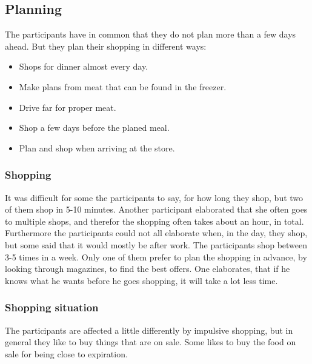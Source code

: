 \subsection{Planning}
The participants have in common that they do not plan more than a few days ahead. But they plan their shopping in different ways:
\begin{itemize}
\item Shops for dinner almost every day.
\item Make plans from meat that can be found in the freezer.
\item Drive far for proper meat.
\item Shop a few days before the planed meal.
\item Plan and shop when arriving at the store.
\end{itemize}

\subsubsection{Shopping}
It was difficult for some the participants to say, for how long they shop, but two of them shop in 5-10 minutes. Another participant elaborated that she often goes to multiple shops, and therefor the shopping often takes about an hour, in total. Furthermore the participants could not all elaborate when, in the day, they shop, but some said that it would mostly be after work. The participants shop between 3-5 times in a week. Only one of them prefer to plan the shopping in advance, by looking through magazines, to find the best offers. One elaborates, that if he knows what he wants before he goes shopping, it will take a lot less time.

\subsubsection{Shopping situation}
The participants are affected a little differently by impulsive shopping, but in general they like to buy things that are on sale. Some likes to buy the food on sale for being close to expiration.